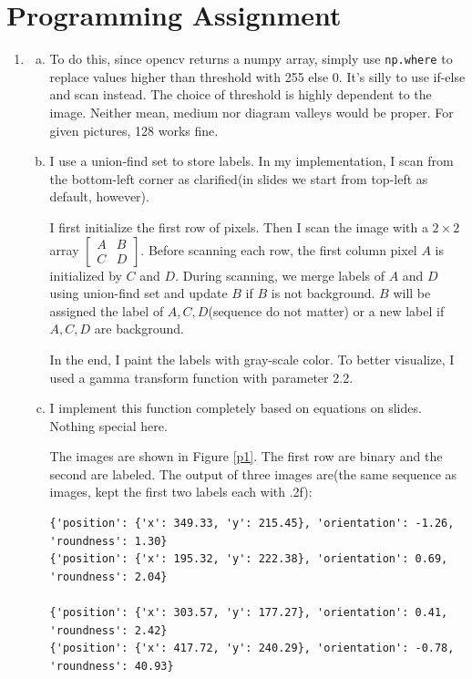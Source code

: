 \documentclass{article}
\theoremstyle{definition}
\begin{document}
	\section*{Programming Assignment}
	\begin{enumerate}[1)]
		\item
		\begin{enumerate}[a.]
			\item To do this, since opencv returns a numpy array, simply use \texttt{np.where} to replace values higher than threshold with 255 else 0. It's silly to use if-else and scan instead. The choice of threshold is highly dependent to the image. Neither mean, medium nor diagram valleys would be proper. For given pictures, 128 works fine. 
			\item I use a union-find set to store labels. In my implementation, I scan from the bottom-left corner as clarified(in slides we start from top-left as default, however).
			
			I first initialize the first row of pixels. Then I scan the image with a $2\times2$ array $\left[\begin{matrix} A & B \\ C & D \end{matrix}\right]$. Before scanning each row, the first column pixel $A$ is initialized by $C$ and $D$. During scanning, we merge labels of $A$ and $D$ using union-find set and update $B$ if $B$ is not background. $B$ will be assigned the label of $A, C, D$(sequence do not matter) or a new label if $A, C, D$ are background. 
			
			In the end, I paint the labels with gray-scale color. To better visualize, I used a gamma transform function with parameter 2.2.
			\item I implement this function completely based on equations on slides. Nothing special here.
			
			The images are shown in Figure \ref{p1}. The first row are binary and the second are labeled. The output of three images are(the same sequence as images, kept the first two labels each with .2f):
			\begin{verbatim}
{'position': {'x': 349.33, 'y': 215.45}, 'orientation': -1.26, 'roundness': 1.30}
{'position': {'x': 195.32, 'y': 222.38}, 'orientation': 0.69, 'roundness': 2.04}

{'position': {'x': 303.57, 'y': 177.27}, 'orientation': 0.41, 'roundness': 2.42}
{'position': {'x': 417.72, 'y': 240.29}, 'orientation': -0.78, 'roundness': 40.93}


\end{verbatim}
\end{enumerate}
\end{enumerate}
\end{document}
